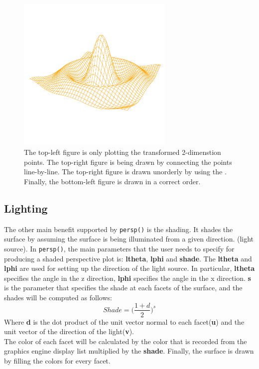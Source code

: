 \documentclass{report}
\begin{document}
\begin{figure}[h]
\begin{center}
		\includegraphics[height = 7.5cm, width = 7.5cm]{figure/standalone_p_4.pdf}
		\caption{The top-left figure is only plotting the transformed 2-dimenstion points. The top-right figure is being drawn by connecting the points line-by-line. The top-right figure is drawn unorderly by using the . Finally, the bottom-left figure is drawn in a correct order.}
		\label{figure_3.2}
	\end{center}
\end{figure}

\subsection{Lighting}
The other main benefit supported by \texttt{persp()} is the shading. It shades the surface by assuming the surface is being illuminated from a given direction. (light source). In \texttt{persp()}, the main parameters that the user needs to specify for producing a shaded perspective plot is: \textbf{ltheta}, \textbf{lphi} and \textbf{shade}. The \textbf{ltheta} and \textbf{lphi} are used for setting up the direction of the light source. In particular, \textbf{ltheta} specifies the angle in the z direction, \textbf{lphi} specifies the angle in the x direction. \textbf{s} is the parameter that specifies the shade at each facets of the surface, and the shades will be computed as follows:
\begin{equation}
Shade = \big(\frac{1 + d}{2}\big)^{s}
\end{equation}
Where \textbf{d} is the dot product of the unit vector normal to each facet(\textbf{u}) and the unit vector of the direction of the light(\textbf{v}). \\

The color of each facet will be calculated by the color that is recorded from the graphics engine display list multiplied by the \textbf{shade}. Finally, the surface is drawn by filling the colors for every facet.\\
\end{document}
